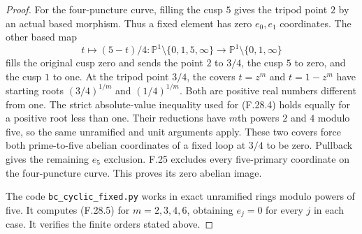 \begin{proof}
For the four-puncture curve,
filling the cusp $5$ gives the
tripod point $2$ by an actual
based morphism.  Thus a fixed
element has zero $e_0,e_1$
coordinates.  The other based
map
\[
 t\longmapsto (5-t)/4:
 \mathbb P^1\setminus\{0,1,5,\infty\}
       \longrightarrow
 \mathbb P^1\setminus\{0,1,\infty\}
\]
fills the original cusp zero
and sends the point $2$ to
$3/4$, the cusp $5$ to zero,
and the cusp $1$ to one.
At the tripod point $3/4$,
the covers $t=z^m$ and
$t=1-z^m$ have starting roots
$(3/4)^{1/m}$ and
$(1/4)^{1/m}$.
Both are positive real numbers
different from one.
The strict absolute-value
inequality used for (F.28.4)
holds equally for a positive
root less than one.
Their reductions have $m$th
powers $2$ and $4$ modulo five,
so the same unramified and
unit arguments apply.
These two covers force both
prime-to-five abelian coordinates
of a fixed loop at $3/4$ to be
zero.  Pullback gives the
remaining $e_5$ exclusion.
F.25 excludes every five-primary
coordinate on the four-puncture
curve.  This proves its zero
abelian image.

The code
\texttt{bc\_cyclic\_fixed.py}
works in exact unramified
rings modulo powers of five.
It computes (F.28.5) for
$m=2,3,4,6$, obtaining
$e_j=0$ for every $j$ in
each case.  It verifies the
finite orders stated above.
\end{proof}

